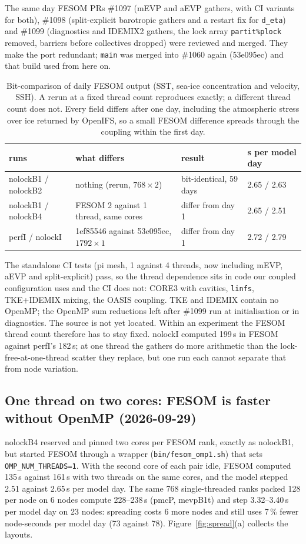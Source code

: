 \documentclass[11pt,a4paper]{article}
\begin{document}
The same day FESOM PRs \#1097 (mEVP and aEVP gathers, with CI variants for both), \#1098 (split-explicit barotropic gathers and a restart fix for \texttt{d\_eta}) and \#1099 (diagnostics and IDEMIX2 gathers, the lock array \texttt{partit\%plock} removed, barriers before collectives dropped) were reviewed and merged. They make the port redundant; \texttt{main} was merged into \#1060 again (53e095ec) and that build used from here on.
\begin{table}[H]\centering\small
\begin{tabular}{llll}\toprule
runs & what differs & result & s per model day\\\midrule
nolockB1 / nolockB2 & nothing (rerun, $768\times2$) & bit-identical, 59 days & 2.65 / 2.63\\
nolockB1 / nolockB4 & FESOM 2 against 1 thread, same cores & differ from day 1 & 2.65 / 2.51\\
perfI / nolockI & 1ef85546 against 53e095ec, $1792\times1$ & differ from day 1 & 2.72 / 2.79\\\bottomrule
\end{tabular}
\caption{Bit-comparison of daily FESOM output (SST, sea-ice concentration and velocity, SSH). A rerun at a fixed thread count reproduces exactly; a different thread count does not. Every field differs after one day, including the atmospheric stress over ice returned by OpenIFS, so a small FESOM difference spreads through the coupling within the first day.}\label{tab:repro}
\end{table}
The standalone CI tests (pi mesh, 1 against 4 threads, now including mEVP, aEVP and split-explicit) pass, so the thread dependence sits in code our coupled configuration uses and the CI does not: CORE3 with cavities, \texttt{linfs}, TKE+IDEMIX mixing, the OASIS coupling. TKE and IDEMIX contain no OpenMP; the OpenMP sum reductions left after \#1099 run at initialisation or in diagnostics. The source is not yet located. Within an experiment the FESOM thread count therefore has to stay fixed. nolockI computed 199\,s in FESOM against perfI's 182\,s; at one thread the gathers do more arithmetic than the lock-free-at-one-thread scatter they replace, but one run each cannot separate that from node variation.

\subsection{One thread on two cores: FESOM is faster without OpenMP (2026-09-29)}
nolockB4 reserved and pinned two cores per FESOM rank, exactly as nolockB1, but started FESOM through a wrapper (\texttt{bin/fesom\_omp1.sh}) that sets \texttt{OMP\_NUM\_THREADS=1}. With the second core of each pair idle, FESOM computed 135\,s against 161\,s with two threads on the same cores, and the model stepped 2.51 against 2.65\,s per model day. The same 768 single-threaded ranks packed 128 per node on 6 nodes compute 228--238\,s (pmcP, mevpB1t) and step 3.32--3.40\,s per model day on 23 nodes: spreading costs 6 more nodes and still uses 7\,\% fewer node-seconds per model day (73 against 78). Figure~\ref{fig:spread}(a) collects the layouts.
\end{document}
